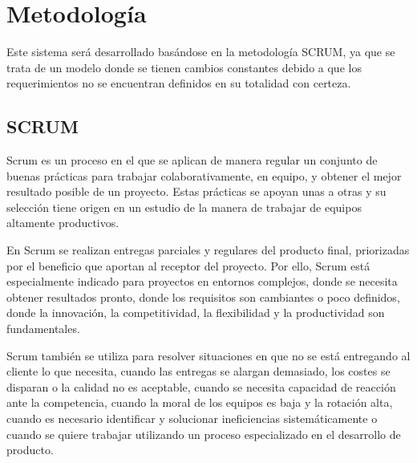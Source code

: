 \section{Metodología}
Este sistema será desarrollado basándose en la metodología SCRUM, ya que se trata de un modelo donde se tienen cambios constantes debido a que los requerimientos no se encuentran definidos en su totalidad con certeza.
\newline
\subsection{SCRUM}
Scrum es un proceso en el que se aplican de manera regular un conjunto de buenas prácticas para trabajar colaborativamente, en equipo, y obtener el mejor resultado posible de un proyecto. Estas prácticas se apoyan unas a otras y su selección tiene origen en un estudio de la manera de trabajar de equipos altamente productivos.

En Scrum se realizan entregas parciales y regulares del producto final, priorizadas por el beneficio que aportan al receptor del proyecto. Por ello, Scrum está especialmente indicado para proyectos en entornos complejos, donde se necesita obtener resultados pronto, donde los requisitos son cambiantes o poco definidos, donde la innovación, la competitividad, la flexibilidad y la productividad son fundamentales.

Scrum también se utiliza para resolver situaciones en que no se está entregando al cliente lo que necesita, cuando las entregas se alargan demasiado, los costes se disparan o la calidad no es aceptable, cuando se necesita capacidad de reacción ante la competencia, cuando la moral de los equipos es baja y la rotación alta, cuando es necesario identificar y solucionar ineficiencias sistemáticamente o cuando se quiere trabajar utilizando un proceso especializado en el desarrollo de producto. \cite{scrum}